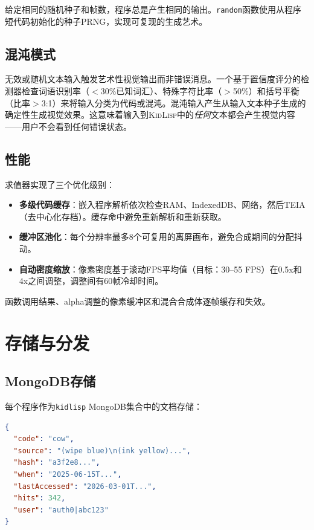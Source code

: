 \documentclass[10pt,letterpaper,twocolumn]{article}
\newcommand{\kidlisp}{\textsc{KidLisp}}
\begin{document}
给定相同的随机种子和帧数，程序总是产生相同的输出。\texttt{random}函数使用从程序短代码初始化的种子PRNG，实现可复现的生成艺术。

\subsection{混沌模式}

无效或随机文本输入触发艺术性视觉输出而非错误消息。一个基于置信度评分的检测器检查词语识别率（$<$30\%已知词汇）、特殊字符比率（$>$50\%）和括号平衡（比率$>$3:1）来将输入分类为代码或混沌。混沌输入产生从输入文本种子生成的确定性生成视觉效果。这意味着输入到\kidlisp{}中的\emph{任何}文本都会产生视觉内容——用户不会看到任何错误状态。

\subsection{性能}

求值器实现了三个优化级别：

\begin{itemize}
  \item \textbf{多级代码缓存}：嵌入程序解析依次检查RAM、IndexedDB、网络，然后TEIA（去中心化存档）。缓存命中避免重新解析和重新获取。
  \item \textbf{缓冲区池化}：每个分辨率最多8个可复用的离屏画布，避免合成期间的分配抖动。
  \item \textbf{自动密度缩放}：像素密度基于滚动FPS平均值（目标：30--55 FPS）在0.5x和4x之间调整，调整间有60帧冷却时间。
\end{itemize}

函数调用结果、alpha调整的像素缓冲区和混合合成体逐帧缓存和失效。

\section{存储与分发}
\label{sec:infrastructure}

\subsection{MongoDB存储}

每个程序作为\texttt{kidlisp} MongoDB集合中的文档存储：

\begin{lstlisting}[language=json]
{
  "code": "cow",
  "source": "(wipe blue)\n(ink yellow)...",
  "hash": "a3f2e8...",
  "when": "2025-06-15T...",
  "lastAccessed": "2026-03-01T...",
  "hits": 342,
  "user": "auth0|abc123"
}
\end{lstlisting}
\end{document}

